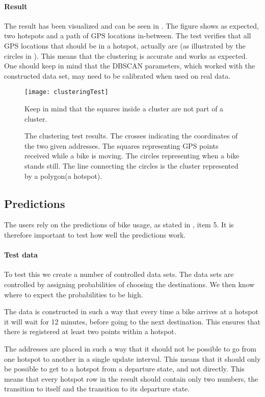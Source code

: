 \paragraph{Result}
The result has been visualized and can be seen in .
The figure shows as expected, two hotspots and a path of GPS locations in-between.
The test verifies that all GPS locations that should be in a hotspot, actually are (as illustrated by the circles in ).
This means that the clustering is accurate and works as expected.
One should keep in mind that the DBSCAN parameters, which worked with the constructed data set, may need to be calibrated when used on real data.

\begin{figure}
\texttt{[image: clusteringTest]}
\caption{The clustering test results. 
The crosses indicating the coordinates of the two given addresses. The squares representing GPS points received while a bike is moving. The circles representing when a bike stands still. The line connecting the circles is the cluster represented by a polygon(a hotspot).}
 Keep in mind that the squares inside a cluster are not part of a cluster.
\label{fig:test:clustering}
\end{figure}

\subsection{Predictions}
The users rely on the predictions of bike usage, as stated in , item 5.
It is therefore important to test how well the predictions work.

\paragraph{Test data} To test this we create a number of controlled data sets.
The data sets are controlled by assigning probabilities of choosing the destinations. 
We then know where to expect the probabilities to be high.

The data is constructed in such a way that every time a bike arrives at a hotspot it will wait for 12 minutes, before going to the next destination.
This ensures that there is registered at least two points within a hotspot.

The addresses are placed in such a way that it should not be possible to go from one hotspot to another in a single update interval.
This means that it should only be possible to get to a hotspot from a departure state, and not directly.
This means that every hotspot row in the result should contain only two numbers, the transition to itself and the transition to its departure state.

